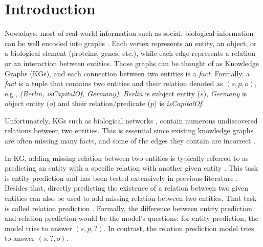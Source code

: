 \chapter{Introduction}
\label{cha:intro}
Nowadays, most of real-world information such as social, biological information can be well encoded into graphs \citep{lu2011link}. Each vertex represents an entity, an object, or a biological element (proteins, genes, etc.), while each edge represents a relation or an interaction between entities. Those graphs can be thought of as Knowledge Graphs (KGs), and each connection between two entities is a \textit{fact}. Formally, a \textit{fact} is a tuple that contains two entities and their relation denoted as $(s,p,o)$, e.g., \textit{(Berlin, isCapitalOf, Germany)}. \textit{Berlin} is subject entity ($s$), \textit{Germany} is object entity ($o$) and their relation/predicate ($p$) is \textit{isCapitalOf}.

Unfortunately, KGs such as biological networks \citep{amaral2008truer, stumpf2008estimating, yu2008high}, contain numerous undiscovered relations between two entities. This is essential since existing knowledge graphs are often missing many facts, and some of the edges they contain are incorrect \citep{angeli2013philosophers}. 

In KG, adding missing relation between two entities is typically referred to as predicting an entity with a specific relation with another given entity \citep{wang2017knowledge}. This task is entity prediction \citep{lin2015modeling} and has been tested extensively in previous literature \citep{bordes2013translating, lin2015learning, nickel2016holographic, wang2014knowledge}. Besides that, directly predicting the existence of a relation between two given entities can also be used to add missing relation between two entities. That task is called relation prediction \citep{lin2015modeling, xie2016representation}. 
Formally, the difference between entity prediction and relation prediction would be the model's questions: for entity prediction, the model tries to answer $(s,p,?)$. In contrast, the relation prediction model tries to answer $(s,?,o)$. 

